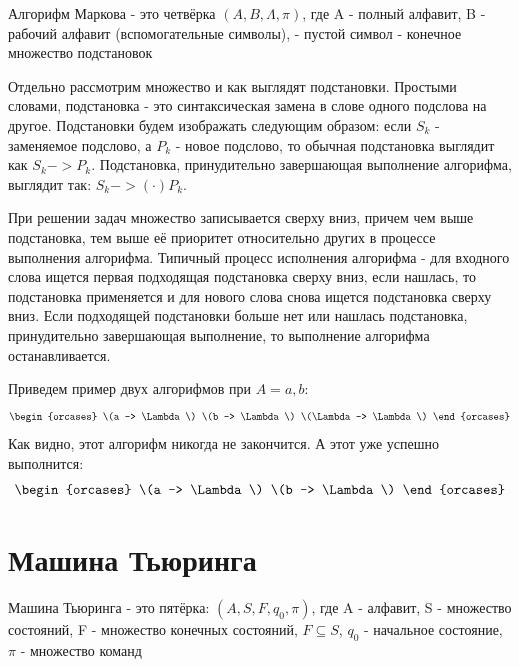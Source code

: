 \begin{definition}
  Алгорифм Маркова - это четвёрка \((A, B, \Lambda, \pi)\), где
  A - полный алфавит,
  B - рабочий алфавит (вспомогательные символы),
  \Lambda - пустой символ
  \pi - конечное множество подстановок
\end{definition}

Отдельно рассмотрим множество \pi и как выглядят подстановки. Простыми словами, подстановка -
это синтаксическая замена в слове одного подслова на другое. Подстановки будем изображать
следующим образом: если \(S_k\) - заменяемое подслово, а \(P_k\) - новое подслово,
то обычная подстановка выглядит как \(S_k -> P_k\). Подстановка, принудительно завершающая
выполнение алгорифма, выглядит так: \(S_k -> (\cdot) P_k\).

При решении задач множество \pi записывается сверху вниз, причем чем выше подстановка, тем
выше её приоритет относительно других в процессе выполнения алгорифма. Типичный процесс
исполнения алгорифма - для входного слова ищется первая подходящая подстановка сверху вниз,
если нашлась, то подстановка применяется и для нового слова снова ищется подстановка сверху вниз.
Если подходящей подстановки больше нет или нашлась подстановка, принудительно завершающая выполнение,
то выполнение алгорифма останавливается.

Приведем пример двух алгорифмов при \(A = {a, b}\):
\begin{equation}
  \begin{orcases}
  \(a -> \Lambda\)
  \(b -> \Lambda\)
  \(\Lambda -> \Lambda\)
  \end{orcases}
\end{equation}
Как видно, этот алгорифм никогда не закончится. А этот уже успешно выполнится:
\begin{equation}
  \begin{orcases}
  \(a -> \Lambda\)
  \(b -> \Lambda\)
  \end{orcases}
\end{equation}

\section{Машина Тьюринга}

\begin{definition}
  Машина Тьюринга - это пятёрка: \((A, S, F, q_{0}, \pi)\), где
  A - алфавит,
  S - множество состояний,
  F - множество конечных состояний, \(F \subseteq S\),
  \(q_{0}\) - начальное состояние,
  \(\pi\) - множество команд
\end{definition}

